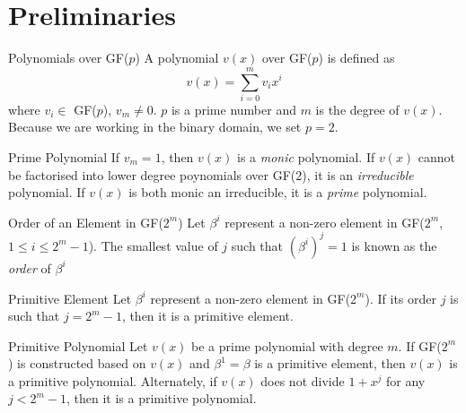 \section{Preliminaries}
\label{secPrelim}
\begin{definition}{Polynomials over GF($p$) \newline}
A polynomial $v(x)$ over GF($p$) is defined as 
\begin{equation*}
v(x) = \sum_{i=0}^{m} v_ix^i
\end{equation*}
where $v_i \in $ GF($p$), $v_m \neq 0$. $p$ is a prime number and $m$ is the degree of  $v(x)$. Because we are working in the binary domain, we set $p=2$.
\end{definition}


\begin{definition}{Prime Polynomial \newline}
If $v_m=1$, then $v(x)$ is a \textit{monic} polynomial. If $v(x)$ cannot be factorised into lower degree poynomials over GF($2$), it is an \textit{irreducible} polynomial. If $v(x)$ is both monic an irreducible, it is a \textit{prime} polynomial.
\end{definition}

\begin{definition}{Order of an Element in GF($2^m$) \newline}
Let $\beta^i$ represent a non-zero element in GF($2^m$, $1 \leq i \leq 2^m-1$). The smallest value of $j$ such that $(\beta^i)^j=1$ is known as the \textit{order} of $\beta^i$
\end{definition}

\begin{definition}{Primitive Element \newline}
Let $\beta^i$ represent a non-zero element in GF($2^m$). If its order $j$ is such that $j=2^m-1$, then it is a primitive element.
\end{definition}

\begin{definition}{Primitive Polynomial \newline}
Let $v(x)$ be a prime polynomial with degree $m$. If GF($2^m$) is constructed based on $v(x)$ and $\beta^1 = \beta$ is a primitive element, then $v(x)$ is a primitive polynomial. Alternately, if $v(x)$ does not divide $1+x^j$ for any $j<2^m-1$, then it is a primitive polynomial. 
\end{definition}

